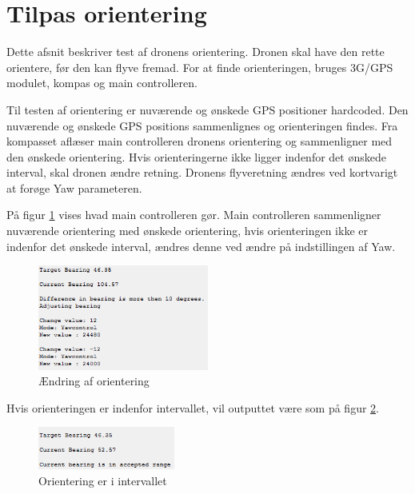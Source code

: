 \newpage

\section{Tilpas orientering}

Dette afsnit beskriver test af dronens orientering. Dronen skal have den rette orientere, før den kan flyve fremad. For at finde orienteringen, bruges 3G/GPS modulet, kompas og main controlleren.

Til testen af orientering er nuværende og ønskede GPS positioner hardcoded. 
Den nuværende og ønskede GPS positions sammenlignes og orienteringen findes. 
Fra kompasset aflæser main controlleren dronens orientering og sammenligner med den ønskede orientering. Hvis orienteringerne ikke ligger indenfor det ønskede interval, skal dronen ændre retning. Dronens flyveretning ændres ved kortvarigt at forøge Yaw parameteren. 


På figur \ref{fig:orientering_skift} vises hvad main controlleren gør. Main controlleren sammenligner nuværende orientering med ønskede orientering, hvis orienteringen ikke er indenfor det ønskede interval, ændres denne ved ændre på indstillingen af Yaw.

\begin{figure}[H]
\centering
\includegraphics[width=0.5\textwidth]{Billeder/Test/bearing_test.png}
\caption{Ændring af orientering}
\label{fig:orientering_skift}
\end{figure}

\vspace{0.5cm}

Hvis orienteringen er indenfor intervallet, vil outputtet være som på figur \ref{fig:orientering_interval}.

\begin{figure}[H]
\centering
\includegraphics[width=0.4\textwidth]{Billeder/Test/bearing_reached.png}
\caption{Orientering er i intervallet}
\label{fig:orientering_interval}
\end{figure}